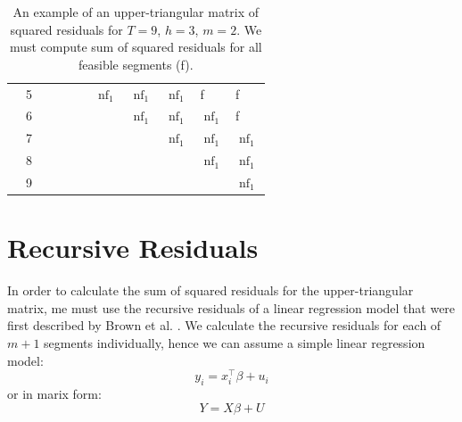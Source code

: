 \documentclass[main.tex]{subfiles}
\begin{document}
\begin{table}[]
\begin{tabular}{lllllllllll}
\multicolumn{1}{l|}{}              & \multicolumn{1}{l|}{5} & \multicolumn{1}{l|}{}     & \multicolumn{1}{l|}{}     & \multicolumn{1}{l|}{}     & \multicolumn{1}{l|}{}     & \multicolumn{1}{l|}{$\operatorname{nf}_1$} & \multicolumn{1}{l|}{$\operatorname{nf}_1$} & \multicolumn{1}{l|}{$\operatorname{nf}_1$} & \multicolumn{1}{l|}{f}   & \multicolumn{1}{l|}{f}   \\ \cline{2-11} 
\multicolumn{1}{l|}{}              & \multicolumn{1}{l|}{6} & \multicolumn{1}{l|}{}     & \multicolumn{1}{l|}{}     & \multicolumn{1}{l|}{}     & \multicolumn{1}{l|}{}     & \multicolumn{1}{l|}{}     & \multicolumn{1}{l|}{$\operatorname{nf}_1$} & \multicolumn{1}{l|}{$\operatorname{nf}_1$} & \multicolumn{1}{l|}{$\operatorname{nf}_1$} & \multicolumn{1}{l|}{f}   \\ \cline{2-11} 
\multicolumn{1}{l|}{}              & \multicolumn{1}{l|}{7} & \multicolumn{1}{l|}{}     & \multicolumn{1}{l|}{}     & \multicolumn{1}{l|}{}     & \multicolumn{1}{l|}{}     & \multicolumn{1}{l|}{}     & \multicolumn{1}{l|}{}     & \multicolumn{1}{l|}{$\operatorname{nf}_1$} & \multicolumn{1}{l|}{$\operatorname{nf}_1$} & \multicolumn{1}{l|}{$\operatorname{nf}_1$} \\ \cline{2-11} 
\multicolumn{1}{l|}{}              & \multicolumn{1}{l|}{8} & \multicolumn{1}{l|}{}     & \multicolumn{1}{l|}{}     & \multicolumn{1}{l|}{}     & \multicolumn{1}{l|}{}     & \multicolumn{1}{l|}{}     & \multicolumn{1}{l|}{}     & \multicolumn{1}{l|}{}     & \multicolumn{1}{l|}{$\operatorname{nf}_1$} & \multicolumn{1}{l|}{$\operatorname{nf}_1$} \\ \cline{2-11} 
\multicolumn{1}{l|}{}              & \multicolumn{1}{l|}{9} & \multicolumn{1}{l|}{}     & \multicolumn{1}{l|}{}     & \multicolumn{1}{l|}{}     & \multicolumn{1}{l|}{}     & \multicolumn{1}{l|}{}     & \multicolumn{1}{l|}{}     & \multicolumn{1}{l|}{}     & \multicolumn{1}{l|}{}     & \multicolumn{1}{l|}{$\operatorname{nf}_1$} \\ \cline{2-11} 
\end{tabular}
\caption{An example of an upper-triangular matrix of squared residuals for $T =
  9$, $h=3$, $m=2$. We must compute sum of squared residuals for all feasible
  segments (f).
}
\label{table_4_1}
\end{table}


\section{Recursive Residuals}
\label{sec:recursive_residuals}
In order to calculate the sum of squared residuals for the upper-triangular
matrix, me must use the recursive residuals of a linear regression model that
were first described by Brown et al. \cite{brown75}. We calculate the recursive
residuals for each of $m + 1$ segments individually, hence we can assume a
simple linear regression model:
\[
y_i = x_i^{\top} \beta + u_i
\]
or in marix form:
\[
Y = X\beta + U
\]
\end{document}
